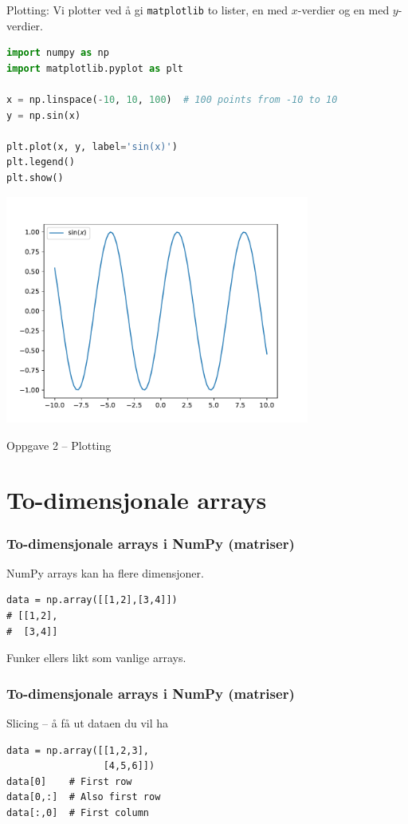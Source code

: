 \documentclass{beamer}
\begin{document}
\begin{frame}[fragile]
  Plotting:
  Vi plotter ved å gi \lstinline{matplotlib} to lister, en med $x$-verdier og en med $y$-verdier.
  \begin{lstlisting}[language=python, breaklines=true, frame=single]
import numpy as np
import matplotlib.pyplot as plt
    
x = np.linspace(-10, 10, 100)  # 100 points from -10 to 10
y = np.sin(x)

plt.plot(x, y, label='sin(x)')
plt.legend()
plt.show()
  \end{lstlisting}
\end{frame}
\begin{frame}
  \centering
  \includegraphics[width=0.75\textwidth]{simple_plot}
\end{frame}

\begin{frame}
  \begin{block}{Oppgave 2 -- Plotting}\end{block}
\end{frame}


\section{To-dimensjonale arrays}

\begin{frame}[fragile]
  \frametitle{To-dimensjonale arrays i NumPy (matriser)}
  NumPy arrays kan ha flere dimensjoner.
  \begin{lstlisting}
data = np.array([[1,2],[3,4]])
# [[1,2],
#  [3,4]]
  \end{lstlisting}
  Funker ellers likt som vanlige arrays.\\
\end{frame}
\begin{frame}[fragile]
  \frametitle{To-dimensjonale arrays i NumPy (matriser)}
  Slicing -- å få ut dataen du vil ha
  \begin{lstlisting}
data = np.array([[1,2,3],
                 [4,5,6]])
data[0]    # First row
data[0,:]  # Also first row
data[:,0]  # First column
  \end{lstlisting}
\end{frame}
\end{document}
